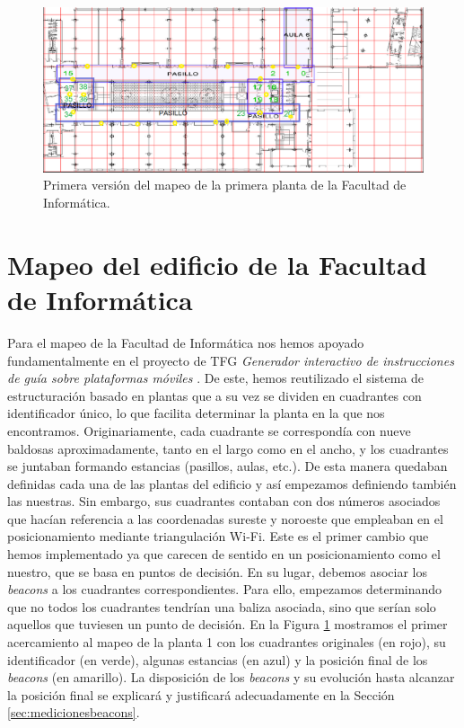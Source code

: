 \begin{figure}[t]
	\centering
	\includegraphics[width=1\textwidth]{Imagenes/Descripciondeltrabajo/mapaplanta1_cuadrantes}
	\caption{Primera versión del mapeo de la primera planta de la Facultad de Informática.}
	\label{fig:cuadrantesP1_v1}
\end{figure}



\section{Mapeo del edificio de la Facultad de Informática}
\label{sec:mapeo}

Para el mapeo de la Facultad de Informática nos hemos apoyado fundamentalmente en el proyecto de TFG \textit{Generador interactivo de instrucciones de guía sobre plataformas móviles} \citep{TFGguia}. De este, hemos reutilizado el sistema de estructuración basado en plantas que a su vez se dividen en cuadrantes con identificador único, lo que facilita determinar la planta en la que nos encontramos.
Originariamente, cada cuadrante se correspondía con nueve baldosas aproximadamente, tanto en el largo como en el ancho, y los cuadrantes se juntaban formando estancias (pasillos, aulas, etc.). De esta manera quedaban definidas cada una de las plantas del edificio y así empezamos definiendo también las nuestras. Sin embargo, sus cuadrantes contaban con dos números asociados que hacían referencia a las coordenadas sureste y noroeste que empleaban en el posicionamiento mediante triangulación Wi-Fi. Este es el primer cambio que hemos implementado ya que carecen de sentido en un posicionamiento como el nuestro, que se basa en puntos de decisión. En su lugar, debemos asociar los \textit{beacons} a los cuadrantes correspondientes. Para ello, empezamos determinando que no todos los cuadrantes tendrían una baliza asociada, sino que serían solo aquellos que tuviesen un punto de decisión. En la Figura \ref{fig:cuadrantesP1_v1} mostramos el primer acercamiento al mapeo de la planta 1 con los cuadrantes originales (en rojo), su identificador (en verde), algunas estancias (en azul) y la posición final de los \textit{beacons} (en amarillo). La disposición de los \textit{beacons} y su evolución hasta alcanzar la posición final se explicará y justificará adecuadamente en la Sección \ref{sec:medicionesbeacons}.


